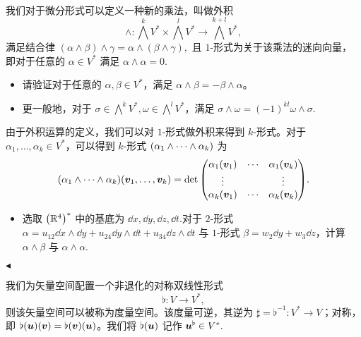 \documentclass[11pt]{article}
\newenvironment{question}[2][Question]{\begin{trivlist}
\item[\hskip \labelsep {\bfseries #1}\hskip \labelsep {\bfseries #2.}]}{\hfill$\blacktriangleleft$\end{trivlist}}
\newcommand{\RR}{\mathbb{R}}
\begin{document}
    \begin{question}{3 (15') (外积)}~\\
    我们对于微分形式可以定义一种新的乘法，叫做外积
    \[ \wedge: \bigwedge^k V^* \times \bigwedge^l V^* \to \bigwedge^{k+l} V^*, \]
    满足结合律 $(\alpha \wedge \beta) \wedge \gamma = \alpha \wedge (\beta \wedge \gamma),$ 且 $1$-形式为关于该乘法的迷向向量，即对于任意的 $\alpha \in V^*$ 满足 $\alpha \wedge \alpha = 0.$

    \begin{itemize}
        \item [a (5')] 请验证对于任意的 $\alpha, \beta \in V^*$，满足 $\alpha \wedge \beta = -\beta \wedge \alpha$。
        \item [b (5')] 更一般地，对于 $\sigma \in \bigwedge^k V^*, \omega \in \bigwedge^l V^*$，满足 $\sigma \wedge \omega = (-1)^{kl} \omega \wedge \sigma.$
    \end{itemize}

    由于外积运算的定义，我们可以对 $1$-形式做外积来得到 $k$-形式。对于 $\alpha_1, \ldots, \alpha_k \in V^*$，可以得到 $k$-形式 $\qty(\alpha_1 \wedge \cdots \wedge \alpha_k)$ 为
    \[ \qty(\alpha_1 \wedge \cdots \wedge \alpha_k)\qty(\vb*{v}_1, \ldots, \vb*{v}_k) = \det\mqty(\alpha_1(\vb*{v}_1) & \cdots & \alpha_1(\vb*{v}_k) \\
     \vdots & & \vdots \\ 
     \alpha_k(\vb*{v}_1) & \cdots & \alpha_k(\vb*{v}_k)). \]


    \begin{itemize}
        \item [c (5')] 选取 $\qty(\RR^4)^*$ 中的基底为 $\dd{x}, \dd{y}, \dd{z}, \dd{t}.$对于 $2$-形式 $\alpha = u_{12} \dd{x} \wedge \dd{y} + u_{24} \dd{y} \wedge \dd{t} + u_{34} \dd{z} \wedge \dd{t}$ 与 $1$-形式 $\beta = w_2 \dd{y} + w_3 \dd{z}$，计算 $\alpha \wedge \beta$ 与 $\alpha \wedge \alpha.$
    \end{itemize}

    \end{question}

    我们为矢量空间配置一个非退化的对称双线性形式
    \[ \flat: V \to V^*, \]
    则该矢量空间可以被称为度量空间。该度量可逆，其逆为 $\sharp = \flat^{-1}: V^* \to V$；对称，即 $\flat(\vb*{u})(\vb*{v}) = \flat(\vb*{v})(\vb*{u})$。我们将 $\flat(\vb*{u})$ 记作 $\vb*{u}^\flat \in V^*.$
\end{document}
